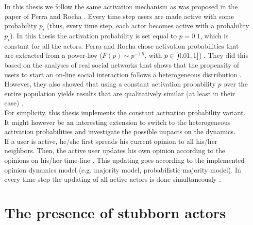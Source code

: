\documentclass[11 pt , letterpaper , twoside , openright]{book}
\begin{document}
In this thesis we follow the same activation mechanism as was proposed in the paper of Perra and Rocha \cite{Perra2019}. Every time step users are made active with some probability $p_i$ (thus, every time step, each actor becomes active with a probability $p_i$). In this thesis the activation probability is set equal to $p = 0.1$, which is constant for all the actors. Perra and Rocha chose activation probabilities that are extracted from a power-law ($F(p) \sim p^{-1.5}$, with $p \in \interval{0.01}{1}$) \cite{Perra2019}. They did this based on the analyses of real social networks that shows that the propensity of users to start an on-line social interaction follows a heterogeneous distribution \cite{Perra2012}\cite{Perra2019}. However, they also showed that using a constant activation probability $p$ over the entire population yields results that are qualitatively similar (at least in their case) \cite{Perra2019}. \\
\newline
For simplicity, this thesis implements the constant activation probability variant. It might however be an interesting extension to switch to the heterogeneous activation probabilities and investigate the possible impacts on the dynamics. \\
\newline
If a user is active, he/she first spreads his current opinion to all his/her neighbors. Then, the active user updates his own opinion according to the opinions on his/her time-line \cite{Perra2019}. This updating goes according to the implemented opinion dynamics model (e.g. majority model, probabilistic majority model). In every time step the updating of all active actors is done simultaneously \cite{Perra2019}.


\section{The presence of stubborn actors}\label{stubb}
\end{document}
